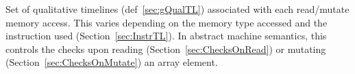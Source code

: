 
Set of qualitative timelines (def~\ref{sec:gQualTL}) associated with each read/mutate memory access.
This varies depending on the memory type accessed and the instruction used (Section~\ref{sec:InstrTL}).
In abstract machine semantics, this controls the checks upon reading (Section~\ref{sec:ChecksOnRead}) or mutating (Section~\ref{sec:ChecksOnMutate}) an array element.

